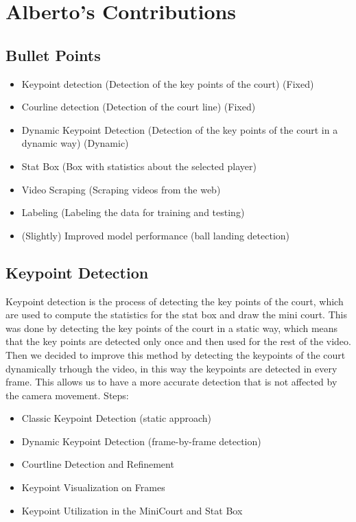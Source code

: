 
\section{Alberto's Contributions}

\subsection{Bullet Points}

\begin{itemize}
    \item Keypoint detection (Detection of the key points of the court) (Fixed)
    \item Courline detection (Detection of the court line) (Fixed)
    \item Dynamic Keypoint Detection (Detection of the key points of the court in a dynamic way) (Dynamic)
    \item Stat Box (Box with statistics about the selected player)
    \item Video Scraping (Scraping videos from the web)
    \item Labeling (Labeling the data for training and testing)
    \item (Slightly) Improved model performance (ball landing detection)
\end{itemize}

\subsection{Keypoint Detection}
Keypoint detection is the process of detecting the key points of the court, which are used to compute the statistics for the stat box and draw the mini court.
This was done by detecting the key points of the court in a static way, which means that the key points are detected only once and then used for the rest of the video.
Then we decided to improve this method by detecting the keypoints of the court dynamically trhough the video, in this way the keypoints are detected in every frame.
This allows us to have a more accurate detection that is not affected by the camera movement.
Steps:
\begin{itemize}
    \item Classic Keypoint Detection (static approach)
    \item Dynamic Keypoint Detection (frame-by-frame detection)
    \item Courtline Detection and Refinement
    \item Keypoint Visualization on Frames
    \item Keypoint Utilization in the MiniCourt and Stat Box
\end{itemize}

